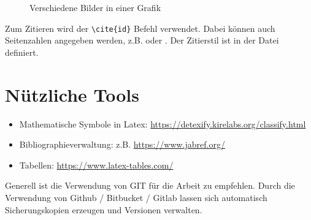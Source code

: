 \begin{figure}[H]
	\centering
	\qquad
	\caption{Verschiedene Bilder in einer Grafik}%
\end{figure}

Zum Zitieren wird der \lstinline|\cite{id}| Befehl verwendet. Dabei können auch Seitenzahlen angegeben werden, z.B. \cite{Haffner2018} oder \cite[S. 15]{Haffner2018}. Der Zitierstil ist in der  Datei definiert.

\section{Nützliche Tools}

\begin{itemize}
	\item Mathematische Symbole in Latex: \newline\url{https://detexify.kirelabs.org/classify.html}
	\item Bibliographieverwaltung: z.B. \url{https://www.jabref.org/}
	\item Tabellen: \url{https://www.latex-tables.com/}
\end{itemize}

Generell ist die Verwendung von GIT für die Arbeit zu empfehlen. Durch die Verwendung von Github / Bitbucket / Gitlab lassen sich automatisch Sicherungskopien erzeugen und Versionen verwalten.